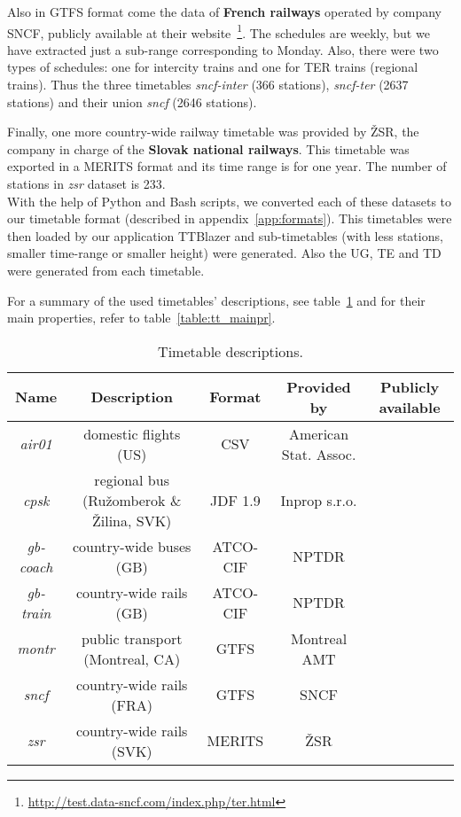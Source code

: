 	Also in GTFS format come the data of \textbf{French railways} operated by company SNCF, publicly available at their website~\footnote{\url{http://test.data-sncf.com/index.php/ter.html}}. The schedules are weekly, but we have extracted just a sub-range corresponding to Monday. Also, there were two types of schedules: one for intercity trains and one for TER trains (regional trains). Thus the three timetables \textit{sncf-inter} (366 stations), \textit{sncf-ter} (2637 stations) and their union \textit{sncf} (2646 stations).
	
	Finally, one more country-wide railway timetable was provided by ŽSR, the company in charge of the \textbf{Slovak national railways}. This timetable was exported in a MERITS format and its time range is for one year. The number of stations in \textit{zsr} dataset is 233. \\
	
	\noindent With the help of Python and Bash scripts, we converted each of these datasets to our timetable format (described in appendix~\ref{app:formats}). This timetables were then loaded by our application TTBlazer and sub-timetables (with less stations, smaller time-range or smaller height) were generated. Also the UG, TE and TD were generated from each timetable.
	
	For a summary of the used timetables' descriptions, see table~\ref{table:tt_desc} and for their main properties, refer to table~\ref{table:tt_mainpr}. \\
	
	\begin{table}[h!]
		\centering
		\footnotesize
		\begin{tabular}{c|c|c|c|c}
			\rowcolor{tablehead}
			\textbf{Name} & \textbf{Description} & \textbf{Format} & \textbf{Provided by} & \textbf{Publicly available} \\
			\hline
			\textit{air01} & domestic flights (US) & CSV & American Stat. Assoc. & \tick \\
			\textit{cpsk} & regional bus (Ružomberok \& Žilina, SVK) & JDF 1.9 & Inprop s.r.o. & \cross \\
			\textit{gb-coach} & country-wide buses (GB) & ATCO-CIF & NPTDR & \tick \\
			\textit{gb-train} & country-wide rails (GB) & ATCO-CIF & NPTDR & \tick \\
			\textit{montr} & public transport (Montreal, CA) & GTFS & Montreal AMT & \tick \\
			\textit{sncf} & country-wide rails (FRA) & GTFS & SNCF & \tick \\
			\textit{zsr} & country-wide rails (SVK) & MERITS & ŽSR & \cross \\
		\end{tabular}
		\caption{\label{table:tt_desc} Timetable descriptions.}
		\normalsize
	\end{table}		
	
